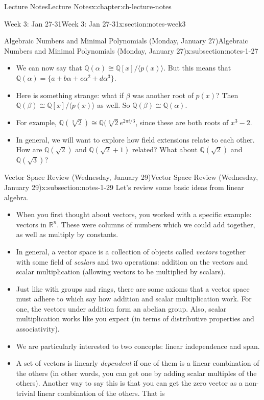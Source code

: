 \documentclass[oneside,11pt,]{book}
\newcommand{\Q}{\mathbb{Q}}
\begin{document}
\begin{chapterptx}{Lecture Notes}{}{Lecture Notes}{}{}{x:chapter:ch-lecture-notes}
\begin{sectionptx}{Week 3: Jan 27-31}{}{Week 3: Jan 27-31}{}{}{x:section:notes-week3}
\begin{subsectionptx}{Algebraic Numbers and Minimal Polynomials (Monday, January 27)}{}{Algebraic Numbers and Minimal Polynomials (Monday, January 27)}{}{}{x:subsection:notes-1-27}
\begin{itemize}[label=\textbullet]
\item{}We can now say that \(\Q(\alpha) \cong \Q[x]/\langle p(x) \rangle\).  But this means that \(\Q(\alpha) = \{a+b\alpha + c\alpha^2 + d \alpha^3\}\).%
\item{}Here is something strange: what if \(\beta\) was another root of \(p(x)\)?  Then \(\Q(\beta) \cong \Q[x]/\langle p(x) \rangle\) as well.  So \(\Q(\beta) \cong \Q(\alpha)\).%
\item{}For example, \(\Q(\sqrt[3]{2}) \cong \Q(\sqrt[3]{2}e^{2\pi i/3}\), since these are both roots of \(x^3 - 2\).%
\item{}In general, we will want to explore how field extensions relate to each other.  How are \(\Q(\sqrt{2})\) and \(\Q(\sqrt{2} + 1)\) related?  What about \(\Q(\sqrt{2})\) and \(\Q(\sqrt{3})\)?%
\end{itemize}
%
\end{subsectionptx}
%
%
\typeout{************************************************}
\typeout{************************************************}
%
\begin{subsectionptx}{Vector Space Review (Wednesday, January 29)}{}{Vector Space Review (Wednesday, January 29)}{}{}{x:subsection:notes-1-29}
Let’s review some basic ideas from linear algebra.%
\par
%
\begin{itemize}[label=\textbullet]
\item{}When you first thought about vectors, you worked with a specific example: vectors in \(\mathbb R^n\). These were columns of numbers which we could add together, as well as multiply by constants.%
\item{}In general, a vector space is a collection of objects called \emph{vectors} together with some field of \emph{scalars} and two operations: addition on the vectors and scalar multiplication (allowing vectors to be multiplied by scalars).%
\item{}Just like with groups and rings, there are some axioms that a vector space must adhere to which say how addition and scalar multiplication work. For one, the vectors under addition form an abelian group. Also, scalar multiplication works like you expect (in terms of distributive properties and associativity).%
\item{}We are particularly interested to two concepts: linear independence and span.%
\item{}A set of vectors is linearly \emph{dependent} if one of them is a linear combination of the others (in other words, you can get one by adding scalar multiples of the others). Another way to say this is that you can get the zero vector as a non-trivial linear combination of the others. That is%

\end{itemize}
\end{subsectionptx}
\end{sectionptx}
\end{chapterptx}
\end{document}
